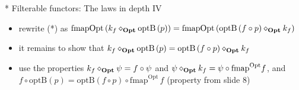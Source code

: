 \documentclass[english]{beamer}
\begin{document}
\begin{frame}{{*} Filterable functors: The laws in depth IV}
\begin{itemize}
\begin{itemize}
have $\text{fmapOpt}\left(k_{f}\right)=\text{fmap}\,k_{f}\circ\text{flatten}=\text{fmap}\:f\circ\text{fmap}\,\text{id}_{\diamond_{\text{\textbf{Opt}}}}\circ\text{flatten}=\text{fmap}\,f$
\item rewrite ({*}) as {\footnotesize{}$\text{fmapOpt}\left(k_{f}\diamond_{\text{\textbf{Opt}}}\text{optB}\left(p\right)\right)=\text{fmapOpt}\left(\text{optB}\left(f\circ p\right)\diamond_{\text{\textbf{Opt}}}k_{f}\right)$ }{\footnotesize \par}
\item it remains to show that {\footnotesize{}$k_{f}\diamond_{\text{\textbf{Opt}}}\text{optB}\left(p\right)=\text{optB}\left(f\circ p\right)\diamond_{\text{\textbf{Opt}}}k_{f}$ }{\footnotesize \par}
\item use the properties {\footnotesize{}$k_{f}\diamond_{\text{\textbf{Opt}}}\psi=f\circ\psi$
and $\psi\diamond_{\text{\textbf{Opt}}}k_{f}=\psi\circ\text{fmap}^{\text{Opt}}f$,
and $f\circ\text{optB}\left(p\right)=\text{optB}\left(f\circ p\right)\circ\text{fmap}^{\text{Opt}}\,f$
(property from slide 8)}{\footnotesize \par}
\end{itemize}
\end{itemize}
\end{frame}
\end{document}
